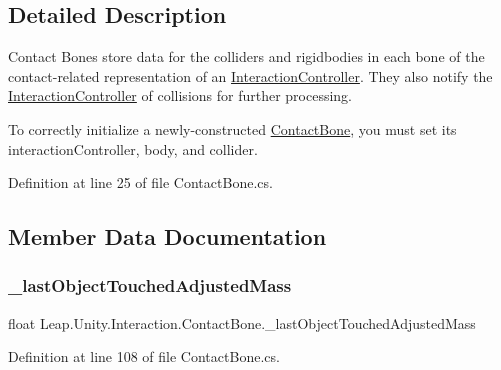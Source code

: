 \subsection{Detailed Description}
Contact Bones store data for the colliders and rigidbodies in each bone of the contact-\/related representation of an \mbox{\hyperlink{class_leap_1_1_unity_1_1_interaction_1_1_interaction_controller}{Interaction\+Controller}}. They also notify the \mbox{\hyperlink{class_leap_1_1_unity_1_1_interaction_1_1_interaction_controller}{Interaction\+Controller}} of collisions for further processing. 

To correctly initialize a newly-\/constructed \mbox{\hyperlink{class_leap_1_1_unity_1_1_interaction_1_1_contact_bone}{Contact\+Bone}}, you must set its interaction\+Controller, body, and collider. 

Definition at line 25 of file Contact\+Bone.\+cs.



\subsection{Member Data Documentation}
\mbox{\label{class_leap_1_1_unity_1_1_interaction_1_1_contact_bone_a703d40dc7b6b968a768515b9f0c07b69}} 
\subsubsection{\texorpdfstring{\_lastObjectTouchedAdjustedMass}{\_lastObjectTouchedAdjustedMass}}
{\footnotesize\ttfamily float Leap.\+Unity.\+Interaction.\+Contact\+Bone.\+\_\+last\+Object\+Touched\+Adjusted\+Mass}



Definition at line 108 of file Contact\+Bone.\+cs.

\mbox{\label{class_leap_1_1_unity_1_1_interaction_1_1_contact_bone_a10be22c6d9f833777f0308a596fa5bed}} 
